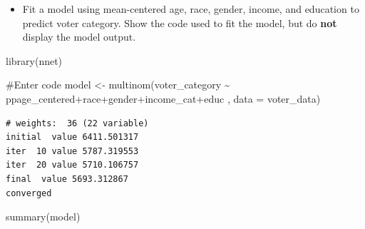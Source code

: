 \documentclass[
  letterpaper,
  DIV=11,
  numbers=noendperiod]{scrartcl}
\newenvironment{Shaded}{\begin{snugshade}}{\end{snugshade}}
\newcommand{\AttributeTok}[1]{\textcolor[rgb]{0.40,0.45,0.13}{#1}}
\newcommand{\CommentTok}[1]{\textcolor[rgb]{0.37,0.37,0.37}{#1}}
\newcommand{\FunctionTok}[1]{\textcolor[rgb]{0.28,0.35,0.67}{#1}}
\newcommand{\NormalTok}[1]{\textcolor[rgb]{0.00,0.23,0.31}{#1}}
\newcommand{\OtherTok}[1]{\textcolor[rgb]{0.00,0.23,0.31}{#1}}
\newcommand{\SpecialCharTok}[1]{\textcolor[rgb]{0.37,0.37,0.37}{#1}}
\providecommand{\tightlist}{%
  \setlength{\itemsep}{0pt}\setlength{\parskip}{0pt}}\usepackage{longtable,booktabs,array}
\begin{document}
\begin{itemize}
\tightlist
\item
  Fit a model using mean-centered age, race, gender, income, and
  education to predict voter category. Show the code used to fit the
  model, but do \textbf{not} display the model output.
\end{itemize}

\begin{Shaded}
\begin{Highlighting}[]
   \FunctionTok{library}\NormalTok{(nnet)}
    
    \CommentTok{\#Enter code}
\NormalTok{    model }\OtherTok{\textless{}{-}} \FunctionTok{multinom}\NormalTok{(voter\_category }\SpecialCharTok{\textasciitilde{}}\NormalTok{ ppage\_centered}\SpecialCharTok{+}\NormalTok{race}\SpecialCharTok{+}\NormalTok{gender}\SpecialCharTok{+}\NormalTok{income\_cat}\SpecialCharTok{+}\NormalTok{educ , }\AttributeTok{data =}\NormalTok{ voter\_data) }
\end{Highlighting}
\end{Shaded}

\begin{verbatim}
# weights:  36 (22 variable)
initial  value 6411.501317 
iter  10 value 5787.319553
iter  20 value 5710.106757
final  value 5693.312867 
converged
\end{verbatim}

\begin{Shaded}
\begin{Highlighting}[]
    \FunctionTok{summary}\NormalTok{(model)}
\end{Highlighting}
\end{Shaded}
\end{document}
